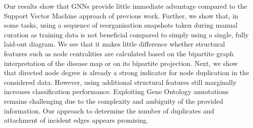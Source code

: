 \documentclass[
	fontsize=10pt, %
	twoside=false, %
	secnumdepth=1, %
  toc=indentunnumbered %
]{kaobook}
\begin{document}
Our results show that GNNs provide little immediate advantage compared to the
Support Vector Machine approach of previous work. 
%
Further, we show that, in some tasks, using a sequence of reorganisation
snapshots taken during manual curation as training data is not beneficial
compared to simply using a single, fully laid-out diagram.
%
We see that it makes little difference whether structural features such as node
centralities are calculated based on the bipartite graph interpretation of the
disease map or on its bipartite projection.
%
Next, we show that directed node degree is already a strong indicator for
node duplication in the considered data. However, using additional structural
features still marginally increases classification performance.
%
Exploiting Gene Ontology annotations remains challenging due to the complexity
and ambiguity of the provided information.
%
Our approach to determine the number of duplicates and attachment of incident
edges appears promising.





\end{document}
